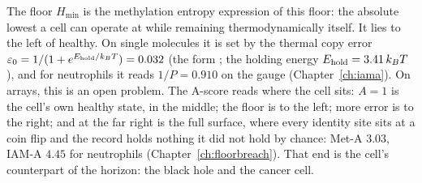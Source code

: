 The floor $H_{\min}$ is the methylation entropy expression of this floor: the absolute lowest a cell can operate at while remaining
thermodynamically itself. It lies to the left of healthy. On single molecules it is set by the thermal copy error
$\varepsilon_0=1/(1+e^{E_{\rm hold}/k_BT})=0.032$ (the form \derived; the holding energy $E_{\rm hold}=3.41\,k_BT$ \measured), and for neutrophils it
reads $1/P=0.910$ on the gauge (Chapter~\ref{ch:iama}). On arrays, this is an open problem. \openprob{} The A-score reads where the cell sits:
$A=1$ is the cell's own healthy state, in the middle; the floor is to the left; more error is to the right; and at the far right is the full
surface, where every identity site sits at a coin flip and the record holds nothing it did not hold by chance: Met-A $3.03$, IAM-A $4.45$ for
neutrophils (Chapter~\ref{ch:floorbreach}). \calc{} That end is the cell's counterpart of the horizon: the black hole and the cancer cell.
\begin{center}\end{center}

